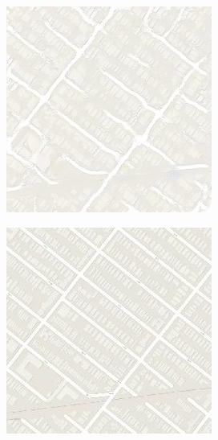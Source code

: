 \begin{figure}
\begin{subfigure}[t]{.2\textwidth}
	  \end{subfigure}
	  \begin{subfigure}[t]{.2\textwidth}
		\centering
		\includegraphics[width=\linewidth]{images/Vergleich/Maps12_t.jpg}
	  \end{subfigure}
	  \begin{subfigure}[t]{.2\textwidth}
		\centering
		\includegraphics[width=\linewidth]{images/Vergleich/Maps12.jpg}
	  \end{subfigure}
	

\end{figure}
